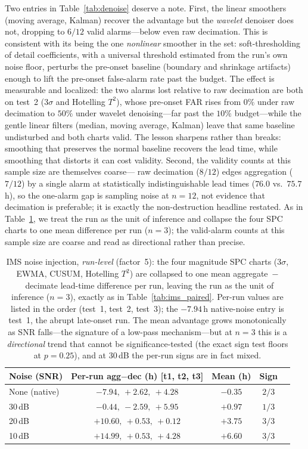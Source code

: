\documentclass[journal]{IEEEtran}
\begin{document}
Two entries in Table~\ref{tab:denoise} deserve a note. First, the linear
smoothers (moving average, Kalman) recover the advantage but the \emph{wavelet}
denoiser does not, dropping to $6/12$ valid alarms---below even raw decimation.
This is consistent with its being the one \emph{nonlinear} smoother in the set:
soft-thresholding of detail coefficients, with a universal threshold estimated
from the run's own noise floor, perturbs the pre-onset baseline (boundary and
shrinkage artifacts) enough to lift the pre-onset false-alarm rate past the budget.
The effect is measurable and localized: the two alarms lost relative to raw
decimation are both on test~2 (3$\sigma$ and Hotelling $T^2$), whose pre-onset FAR
rises from $0\%$ under raw decimation to $50\%$ under wavelet denoising---far past
the $10\%$ budget---while the gentle linear filters (median, moving average,
Kalman) leave that same baseline undisturbed and both charts valid. The lesson sharpens rather than breaks: smoothing that preserves the normal
baseline recovers the lead time, while smoothing that distorts it can cost
validity. Second, the validity counts at this sample size are themselves coarse---
raw decimation ($8/12$) edges aggregation ($7/12$) by a single alarm at
statistically indistinguishable lead times ($76.0$ vs.\ $75.7$\,h), so the
one-alarm gap is sampling noise at $n{=}12$, not evidence that decimation is
preferable; it is exactly the non-destruction headline restated. As in
Table~\ref{tab:noise}, we treat the run as the unit of inference and collapse the
four SPC charts to one mean difference per run ($n{=}3$); the valid-alarm counts at
this sample size are coarse and read as directional rather than precise.

\begin{table}[t]
\caption{IMS noise injection, \emph{run-level} (factor~5): the four
magnitude SPC charts (3$\sigma$, EWMA, CUSUM, Hotelling $T^2$) are collapsed to
one mean aggregate~$-$~decimate lead-time
difference per run, leaving the run as the unit of inference ($n{=}3$), exactly as
in Table~\ref{tab:ims_paired}. Per-run values are listed in the order (test~1,
test~2, test~3); the $-7.94$\,h native-noise entry is test~1, the abrupt
late-onset run. The mean advantage grows monotonically as SNR
falls---the signature of a low-pass mechanism---but at $n{=}3$ this is a
\emph{directional} trend that cannot be significance-tested (the exact sign test
floors at $p{=}0.25$), and at 30\,dB the per-run signs are in fact mixed.}
\label{tab:noise}
\centering
\footnotesize
\setlength{\tabcolsep}{4pt}
\begin{tabular}{@{}lcccc@{}}
\toprule
Noise (SNR) & Per-run agg$-$dec (h) [t1, t2, t3] & Mean (h) & Sign \\
\midrule
None (native) & $-7.94,\ +2.62,\ +4.28$ & $-0.35$ & $2/3$ \\
30\,dB        & $-0.44,\ -2.59,\ +5.95$ & $+0.97$ & $1/3$ \\
20\,dB        & $+10.60,\ +0.53,\ +0.12$ & $+3.75$ & $3/3$ \\
10\,dB        & $+14.99,\ +0.53,\ +4.28$ & $+6.60$ & $3/3$ \\
\bottomrule
\end{tabular}
\end{table}
\end{document}
